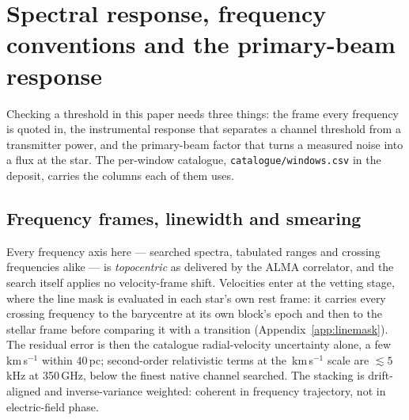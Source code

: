 \section{Spectral response, frequency conventions and the primary-beam
response}
\label{app:conventions}

Checking a threshold in this paper needs three things: the frame every
frequency is quoted in, the instrumental response that separates a channel
threshold from a transmitter power, and the primary-beam factor that turns a
measured noise into a flux at the star. The per-window catalogue,
\texttt{catalogue/windows.csv} in the deposit, carries the columns each of
them uses.



\subsection{Frequency frames, linewidth and smearing}

Every frequency axis here --- searched spectra, tabulated ranges and
crossing frequencies alike --- is \emph{topocentric} as delivered by the
ALMA correlator, and the search itself applies no velocity-frame shift.
Velocities enter at the vetting stage, where the line mask is evaluated in
each star's own rest frame: it carries every crossing frequency to the
barycentre at its own block's epoch and then to the stellar frame before
comparing it with a transition (Appendix~\ref{app:linemask}). The residual
error is then the catalogue radial-velocity uncertainty alone, a few
km\,s$^{-1}$ within 40\,pc; second-order relativistic terms at the
\MaskHalfKms\,km\,s$^{-1}$
scale are $\lesssim5$\,kHz at 350\,GHz, below the finest native channel
searched. The stacking is drift-aligned and inverse-variance weighted:
coherent in frequency trajectory, not in electric-field phase.

